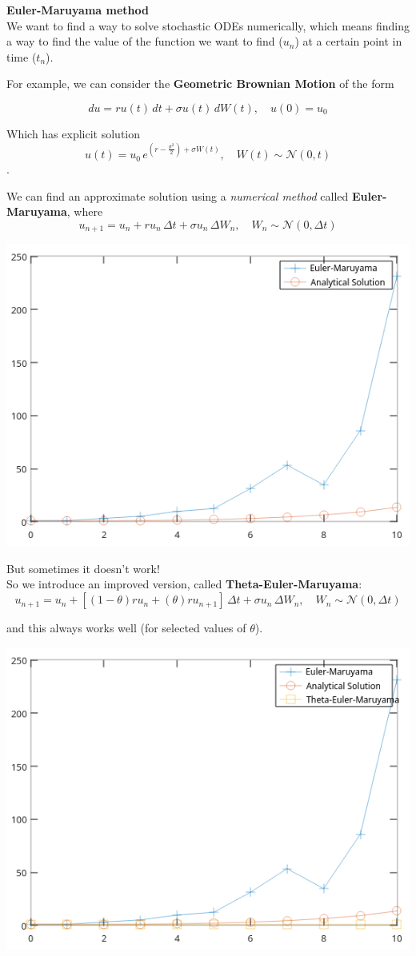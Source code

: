 \documentclass{article}
\begin{document}
\huge
\textbf{Euler-Maruyama method}
\normalsize
\\

We want to find a way to solve stochastic ODEs numerically, which means finding a way to find the value of the function we want to find ($u_n$) at a certain point in time ($t_n$). 

For example, we can consider the \textbf{Geometric Brownian Motion} of the form

\[du = ru(t)\,dt + \sigma u(t) \,dW(t), \quad u(0)=u_0\]

Which has explicit solution \[u(t) = u_0\,e^{\left(r-\frac{\sigma^2}{2}\right)+\sigma W(t)}, \quad W(t)\sim \mathcal{N}(0,t)\].

We can find an approximate solution using a \textit{numerical method} called \textbf{Euler-Maruyama}, where \[u_{n+1} = u_n+ru_n\,\Delta t + \sigma u_n \,\Delta W_n, \quad W_n \sim \mathcal{N}(0,\Delta t)\]

\includegraphics{./pic1}

But sometimes it doesn't work!
\\

So we introduce an improved version, called \textbf{Theta-Euler-Maruyama}: \[u_{n+1} = u_n + \left[(1-\theta)ru_n+(\theta) ru_{n+1}\right]\,\Delta t + \sigma u_n \,\Delta W_n, \quad W_n \sim \mathcal{N}(0,\Delta t)\]

and this always works well (for selected values of $\theta$).

\includegraphics{./pic2}
\end{document}
